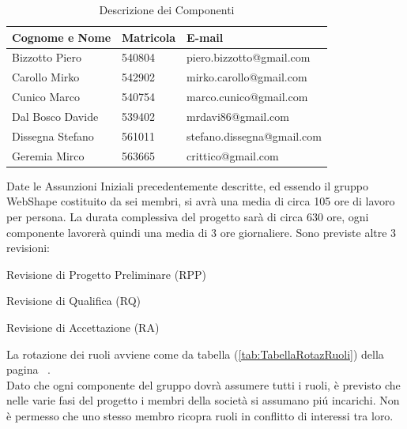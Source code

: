 \begin{table}[h]
	\begin{center}
		  \begin{tabular}{|p{}|l|l|}
		 \hline 
		 \textbf{Cognome e Nome} & \textbf{Matricola} & \textbf{E-mail}\\
		 \hline
		Bizzotto Piero & 540804 & piero.bizzotto@gmail.com \\
		\hline
		Carollo Mirko & 542902 & mirko.carollo@gmail.com\\
		\hline
		Cunico Marco & 540754 & marco.cunico@gmail.com\\
		\hline
		Dal Bosco Davide & 539402 & mrdavi86@gmail.com\\
		\hline
		Dissegna Stefano & 561011 & stefano.dissegna@gmail.com \\
		\hline
		Geremia Mirco & 563665 & crittico@gmail.com\\
		\hline
		\end{tabular}
	\caption{Descrizione dei Componenti} 
	\label{tab:tabella_componenti}
	\end{center}	
\end{table}



Date le Assunzioni Iniziali precedentemente descritte, ed essendo il gruppo WebShape costituito da sei membri, si avr\`a una media di circa 105 ore di lavoro per persona. La durata complessiva del progetto sar\`a di circa 630 ore, ogni componente lavorer\`a quindi una media di 3 ore giornaliere. Sono previste altre 3 revisioni:
\begin{elenconumerato}{\normindent}
				\item Revisione di Progetto Preliminare (RPP)
				\item Revisione di Qualifica (RQ)
				\item Revisione di Accettazione (RA)
			\end{elenconumerato}

La rotazione dei ruoli avviene come da tabella (\ref{tab:TabellaRotazRuoli}) della pagina ~\pageref{tab:TabellaRotazRuoli}.\\
Dato che ogni componente del gruppo dovr\`a assumere tutti i ruoli, \`e previsto che nelle varie fasi del progetto i membri della societ\`a si assumano pi\'u incarichi. Non \`e permesso che uno stesso membro ricopra ruoli in conflitto di interessi tra loro.\\

